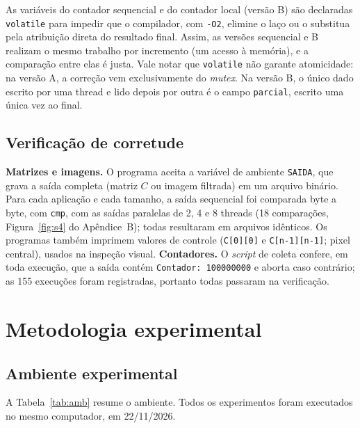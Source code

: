 \documentclass[12pt,a4paper]{article}
\begin{document}
As variáveis do contador sequencial e do contador local (versão B) são declaradas \texttt{volatile} para impedir que o compilador, com \texttt{-O2}, elimine o laço ou o substitua pela atribuição direta do resultado final. Assim, as versões sequencial e B realizam o mesmo trabalho por incremento (um acesso à memória), e a comparação entre elas é justa. Vale notar que \texttt{volatile} não garante atomicidade: na versão A, a correção vem exclusivamente do \emph{mutex}. Na versão B, o único dado escrito por uma thread e lido depois por outra é o campo \texttt{parcial}, escrito uma única vez ao final.

\subsection{Verificação de corretude}

\textbf{Matrizes e imagens.} O programa aceita a variável de ambiente \texttt{SAIDA}, que grava a saída completa (matriz $C$ ou imagem filtrada) em um arquivo binário. Para cada aplicação e cada tamanho, a saída sequencial foi comparada byte a byte, com \texttt{cmp}, com as saídas paralelas de 2, 4 e 8 threads (18 comparações, Figura~\ref{fig:s4} do Apêndice~B); todas resultaram em arquivos idênticos. Os programas também imprimem valores de controle (\texttt{C[0][0]} e \texttt{C[n-1][n-1]}; pixel central), usados na inspeção visual. \textbf{Contadores.} O \emph{script} de coleta confere, em toda execução, que a saída contém \texttt{Contador: 100000000} e aborta caso contrário; as 155 execuções foram registradas, portanto todas passaram na verificação.

\section{Metodologia experimental}

\subsection{Ambiente experimental}

A Tabela~\ref{tab:amb} resume o ambiente. Todos os experimentos foram executados no mesmo computador, em 22/11/2026.
\end{document}
